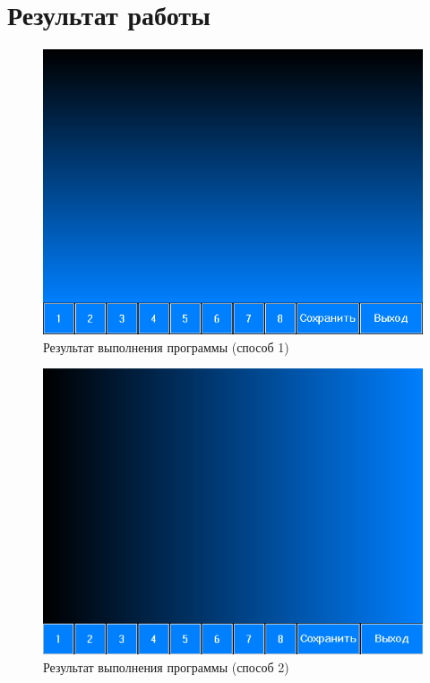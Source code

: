 \documentclass[14pt, a4paper]{extreport}
\begin{document}
\chapter{Результат работы}

\begin{figure}[h!]
	\centering
	\includegraphics[width = 12cm]{image/image_1}
  \caption{Результат выполнения программы (способ 1)}
\end{figure}

\begin{figure}[h!]
	\centering
	\includegraphics[width = 12cm]{image/image_2}
  \caption{Результат выполнения программы (способ 2)}
\end{figure}
\end{document}
